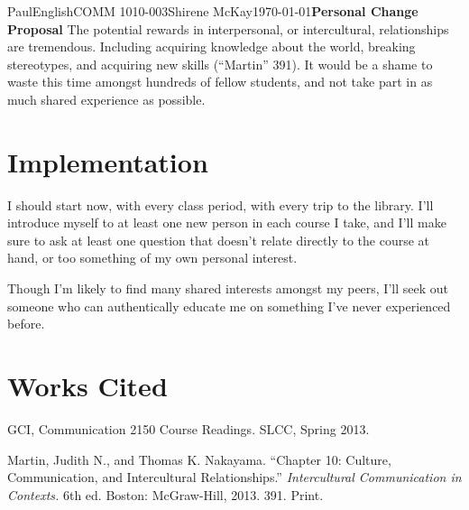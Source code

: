 \documentclass[12pt,letterpaper]{article}
\begin{document}
\begin{mla}{Paul}{English}{COMM 1010-003}{Shirene
    McKay}{\today}{\textbf{Personal Change Proposal}}
The potential rewards in interpersonal, or intercultural,
relationships are tremendous. Including acquiring knowledge about the
world, breaking stereotypes, and acquiring new skills (``Martin'' 391). It
would be a shame to waste this time amongst hundreds of fellow
students, and not take part in as much shared experience as possible.

\section{Implementation}


I should start now, with every class period, with every trip to the
library. I'll introduce myself to at least one new person in each
course I take, and I'll make sure to ask at least one question that
doesn't relate directly to the course at hand, or too something of my
own personal interest.

Though I'm likely to find many shared interests amongst my peers, I'll
seek out someone who can authentically educate me on something I've
never experienced before.

\pagebreak
\section{Works Cited}

\bibent
GCI, Communication 2150 Course Readings. SLCC, Spring 2013.

\bibent
Martin, Judith N., and Thomas K. Nakayama. ``Chapter 10: Culture,
Communication, and Intercultural Relationships.''
\textit{Intercultural Communication in Contexts.} 6th ed. Boston: 
McGraw-Hill, 2013. 391. Print.

\end{mla}
\end{document}
